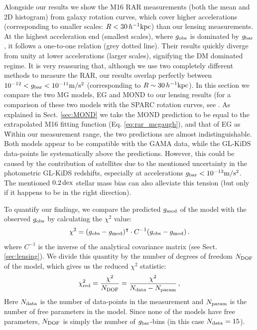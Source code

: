 \documentclass[usenatbib]{mnras}
\newcommand{\hkpc}{\, h^{-1}{\rm{kpc}} }
\newcommand{\mpss}{ {\rm m/s^2} }
\newcommand{\un}[1]{_{\rm #1}}
\newcommand{\dex}{\, {\rm dex}}
\begin{document}
Alongside our results we show the M16 RAR measurements (both the mean and 2D histogram) from galaxy rotation curves, which cover higher accelerations (corresponding to smaller scales: $R < 30 \hkpc$) than our lensing measurements. At the highest acceleration end (smallest scales), where $g\un{obs}$ is dominated by $g\un{bar}$, it follows a one-to-one relation (grey dotted line). Their results quickly diverge from unity at lower accelerations (larger scales), signifying the DM dominated regime. It is very reassuring that, although we use two completely different methods to measure the RAR, our results overlap perfectly between $10^{-12} < g\un{bar} < 10^{-11} \mpss$ (corresponding to $R \sim 30 \hkpc$). In this section we compare the two MG models, EG and MOND to our lensing results (for a comparison of these two models with the SPARC rotation curves, see \citealt{lelli2017a}. As explained in Sect. \ref{sec:MOND} we take the MOND prediction to be equal to the extrapolated M16 fitting function (Eq. \ref{eq:rar_mcgaugh}), and that of EG as  \. Within our measurement range, the two predictions are almost indistinguishable. Both models appear to be compatible with the GAMA data, while the GL-KiDS data-points lie systematically above the predictions. However, this could be caused by the contribution of satellites due to the mentioned uncertainty in the photometric GL-KiDS redshifts, especially at accelerations $g\un{bar} < 10^{-13} \mpss$. The mentioned $0.2 \dex$ stellar mass bias can also alleviate this tension (but only if it happens to be in the right direction).

To quantify our findings, we compare the predicted $g\un{mod}$ of the model with the observed $g\un{obs}$ by calculating the $\chi^2$ value:
\begin{equation}
\chi^2 = (g\un{obs} - g\un{mod})^\intercal \cdot C^{-1}(g\un{obs} - g\un{mod}) \, .
\label{eq:chi2}
\end{equation}
where $C^{-1}$ is the inverse of the analytical covariance matrix (see Sect. \ref{sec:lensing}). We divide this quantity by the number of degrees of freedom $N\un{DOF}$ of the model, which gives us the reduced $\chi^2$ statistic:
\begin{equation}
\chi\un{red}^2 = \frac{\chi^2}{N\un{DOF}} = \frac{\chi^2}{N\un{data} - N\un{param}} \, ,
\end{equation}
Here $N\un{data}$ is the number of data-points in the measurement and $N\un{param}$ is the number of free parameters in the model. Since none of the models have free parameters, $N\un{DOF}$ is simply the number of $g\un{bar}$-bins (in this case $N\un{data}= 15$).
\end{document}
